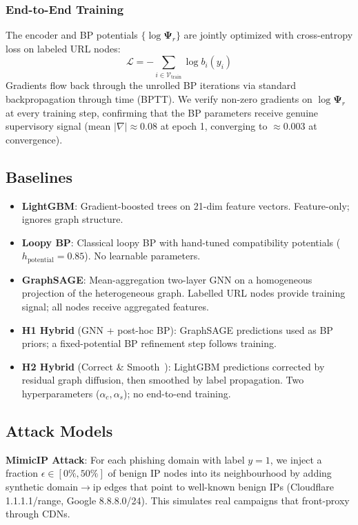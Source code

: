 \documentclass[conference]{IEEEtran}
\begin{document}
\subsubsection{End-to-End Training}
The encoder and BP potentials $\{\log \boldsymbol{\Psi}_r\}$ are jointly
optimized with cross-entropy loss on labeled URL nodes:
\begin{equation}
  \mathcal{L} = -\sum_{i \in \mathcal{V}_\text{train}} \log b_i(y_i)
\end{equation}
Gradients flow back through the unrolled BP iterations via standard
backpropagation through time (BPTT). We verify non-zero gradients on
$\log \boldsymbol{\Psi}_r$ at every training step, confirming that the BP
parameters receive genuine supervisory signal (mean $|\nabla| \approx 0.08$
at epoch 1, converging to $\approx 0.003$ at convergence).

\subsection{Baselines}
\label{sec:baselines}

\begin{itemize}
  \item \textbf{LightGBM}: Gradient-boosted trees on 21-dim feature vectors.
  Feature-only; ignores graph structure.
  \item \textbf{Loopy BP}: Classical loopy BP with hand-tuned compatibility
  potentials ($h_\text{potential} = 0.85$). No learnable parameters.
  \item \textbf{GraphSAGE}: Mean-aggregation two-layer GNN on a homogeneous
  projection of the heterogeneous graph. Labelled URL nodes provide training
  signal; all nodes receive aggregated features.
  \item \textbf{H1 Hybrid} (GNN + post-hoc BP): GraphSAGE predictions used
  as BP priors; a fixed-potential BP refinement step follows training.
  \item \textbf{H2 Hybrid} (Correct \& Smooth~\cite{huang2021}): LightGBM
  predictions corrected by residual graph diffusion, then smoothed by label
  propagation. Two hyperparameters ($\alpha_c, \alpha_s$); no end-to-end training.
\end{itemize}

\subsection{Attack Models}
\label{sec:attacks}

\textbf{MimicIP Attack}: For each phishing domain with label $y=1$, we
inject a fraction $\epsilon \in [0\%, 50\%]$ of benign IP nodes into its
neighbourhood by adding synthetic domain$\to$ip edges that point to
well-known benign IPs (Cloudflare 1.1.1.1/range, Google 8.8.8.0/24).
This simulates real campaigns that front-proxy through CDNs.
\end{document}
